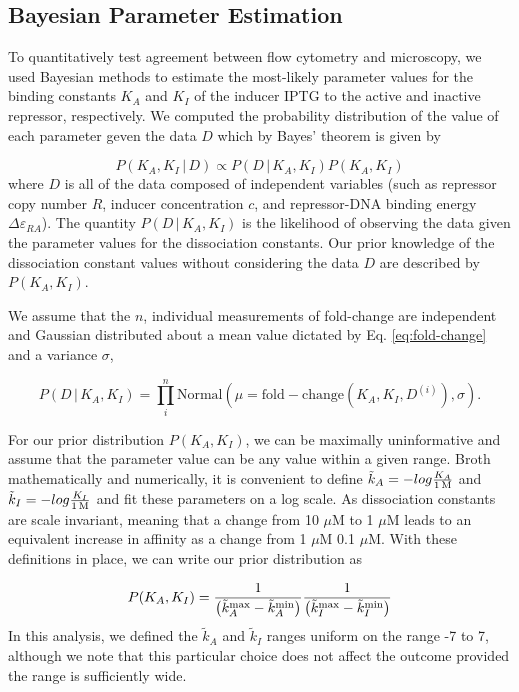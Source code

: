 \documentclass[letterpaper, 10pt]{article}
\begin{document}
\subsection*{Bayesian Parameter Estimation}
To quantitatively test agreement between flow cytometry and microscopy, we
used Bayesian methods to estimate the most-likely parameter values for the
binding constants $K_A$ and $K_I$ of the inducer IPTG to the active and
inactive repressor, respectively. We computed the probability distribution of
the value of each parameter geven the data $D$ which by Bayes' theorem is given
by

\begin{equation}
  P(K_A, K_I \, \vert \, D) \propto P(D\, \vert \, K_A, K_I)P(K_A, K_I)
  \label{eq:bayes_thm}
\end{equation}
where $D$ is all of the data composed of independent variables (such as repressor
copy number $R$, inducer concentration $c$, and repressor-DNA binding energy $\Delta\varepsilon_{RA}$).
The quantity $P(D\, \vert \, K_A, K_I)$ is the likelihood of observing the
data given the parameter values for the dissociation constants. Our
prior knowledge of the dissociation constant values without considering the data $D$
are described by $P(K_A, K_I)$.

We assume that the $n$, individual measurements of fold-change are independent and
Gaussian distributed about a mean value dictated by Eq. \ref{eq:fold-change}
and a variance $\sigma$,

\begin{equation}
  P(D\, \vert \, K_A, K_I) = \prod\limits_i^n\mathrm{Normal}\left(\mu = \mathrm{fold-change}\left(K_A, K_I, D^{(i)}\right),
  \sigma\right).
  \label{eq:likelihood}
\end{equation}

For our prior distribution $P(K_A, K_I)$, we can be maximally uninformative and
assume that the parameter value can be any value within a given range. Broth
mathematically and numerically, it is convenient to define $\tilde{k}_A = -log{K_A \over 1\,\text{M}}$
and $\tilde{k}_I = -log{K_I \over 1\,\text{M}}$ and fit these parameters on a
log scale. As dissociation constants are scale invariant, meaning that a change
from 10 $\mu$M to 1 $\mu$M leads to an equivalent increase in affinity as a
change from 1 $\mu$M 0.1 $\mu$M.  With these definitions in place, we can
write our prior distribution as

\begin{equation}
P(K_A, K_I) = {1 \over \left(\tilde{k}_A^\text{max} - \tilde{k}_A^\text{min}\right)}{1 \over \left(\tilde{k}_I^\text{max} - \tilde{k}_I^\text{min}\right)}
\end{equation}
In this analysis, we  defined the $\tilde{k}_A$ and $\tilde{k}_I$ ranges uniform
on the range -7 to 7, although we note that this particular choice does not affect
the outcome provided the range is sufficiently wide.
\end{document}
